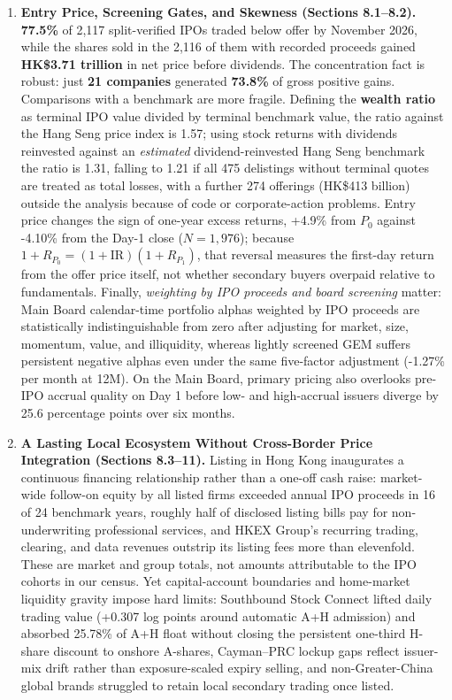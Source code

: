 \documentclass[11pt,letterpaper]{article}
\begin{document}
\begin{enumerate}
\item \textbf{Entry Price, Screening Gates, and Skewness (Sections 8.1–8.2).} \textbf{77.5\%} of 2,117 split-verified IPOs traded below offer by November 2026, while the shares sold in the 2,116 of them with recorded proceeds gained \textbf{HK\$3.71 trillion} in net price before dividends. The concentration fact is robust: just \textbf{21 companies} generated \textbf{73.8\%} of gross positive gains. Comparisons with a benchmark are more fragile. Defining the \textbf{wealth ratio} as terminal IPO value divided by terminal benchmark value, the ratio against the Hang Seng price index is 1.57; using stock returns with dividends reinvested against an \textit{estimated} dividend-reinvested Hang Seng benchmark the ratio is 1.31, falling to 1.21 if all 475 delistings without terminal quotes are treated as total losses, with a further 274 offerings (HK\$413 billion) outside the analysis because of code or corporate-action problems. Entry price changes the sign of one-year excess returns, +4.9\% from $P_0$ against -4.10\% from the Day-1 close ($N = 1,976$); because $1+R_{P_0} = (1+\text{IR})(1+R_{P_1})$, that reversal measures the first-day return from the offer price itself, not whether secondary buyers overpaid relative to fundamentals. Finally, \textit{weighting by IPO proceeds and board screening} matter: Main Board calendar-time portfolio alphas weighted by IPO proceeds are statistically indistinguishable from zero after adjusting for market, size, momentum, value, and illiquidity, whereas lightly screened GEM suffers persistent negative alphas even under the same five-factor adjustment (-1.27\% per month at 12M). On the Main Board, primary pricing also overlooks pre-IPO accrual quality on Day 1 before low- and high-accrual issuers diverge by 25.6 percentage points over six months.
\item \textbf{A Lasting Local Ecosystem Without Cross-Border Price Integration (Sections 8.3–11).} Listing in Hong Kong inaugurates a continuous financing relationship rather than a one-off cash raise: market-wide follow-on equity by all listed firms exceeded annual IPO proceeds in 16 of 24 benchmark years, roughly half of disclosed listing bills pay for non-underwriting professional services, and HKEX Group's recurring trading, clearing, and data revenues outstrip its listing fees more than elevenfold. These are market and group totals, not amounts attributable to the IPO cohorts in our census. Yet capital-account boundaries and home-market liquidity gravity impose hard limits: Southbound Stock Connect lifted daily trading value (+0.307 log points around automatic A+H admission) and absorbed 25.78\% of A+H float without closing the persistent one-third H-share discount to onshore A-shares, Cayman–PRC lockup gaps reflect issuer-mix drift rather than exposure-scaled expiry selling, and non-Greater-China global brands struggled to retain local secondary trading once listed.
\end{enumerate}
\end{document}
